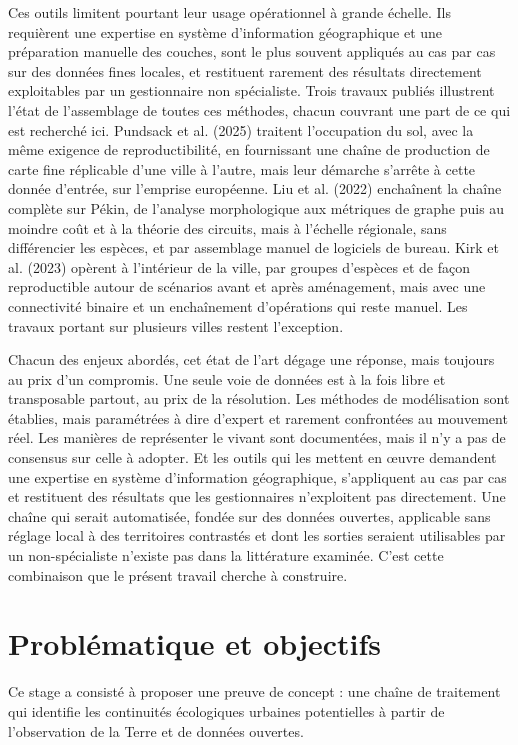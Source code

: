 \documentclass[a4paper,12pt]{report}
\begin{document}
Ces outils limitent pourtant leur usage opérationnel à grande échelle. Ils requièrent une expertise en système d'information géographique et une préparation manuelle des couches, sont le plus souvent appliqués au cas par cas sur des données fines locales, et restituent rarement des résultats directement exploitables par un gestionnaire non spécialiste. Trois travaux publiés illustrent l'état de l'assemblage de toutes ces méthodes, chacun couvrant une part de ce qui est recherché ici. Pundsack et al. (2025) traitent l'occupation du sol, avec la même exigence de reproductibilité, en fournissant une chaîne de production de carte fine réplicable d'une ville à l'autre, mais leur démarche s'arrête à cette donnée d'entrée, sur l'emprise européenne. Liu et al. (2022) enchaînent la chaîne complète sur Pékin, de l'analyse morphologique aux métriques de graphe puis au moindre coût et à la théorie des circuits, mais à l'échelle régionale, sans différencier les espèces, et par assemblage manuel de logiciels de bureau. Kirk et al. (2023) opèrent à l'intérieur de la ville, par groupes d'espèces et de façon reproductible autour de scénarios avant et après aménagement, mais avec une connectivité binaire et un enchaînement d'opérations qui reste manuel. Les travaux portant sur plusieurs villes restent l'exception.

Chacun des enjeux abordés, cet état de l'art dégage une réponse, mais toujours au prix d'un compromis. Une seule voie de données est à la fois libre et transposable partout, au prix de la résolution. Les méthodes de modélisation sont établies, mais paramétrées à dire d'expert et rarement confrontées au mouvement réel. Les manières de représenter le vivant sont documentées, mais il n'y a pas de consensus sur celle à adopter. Et les outils qui les mettent en œuvre demandent une expertise en système d'information géographique, s'appliquent au cas par cas et restituent des résultats que les gestionnaires n'exploitent pas directement. Une chaîne qui serait automatisée, fondée sur des données ouvertes, applicable sans réglage local à des territoires contrastés et dont les sorties seraient utilisables par un non-spécialiste n'existe pas dans la littérature examinée. C'est cette combinaison que le présent travail cherche à construire.

\section{Problématique et objectifs}
Ce stage a consisté à proposer une preuve de concept : une chaîne de traitement qui identifie les continuités écologiques urbaines potentielles à partir de l'observation de la Terre et de données ouvertes.
\end{document}
